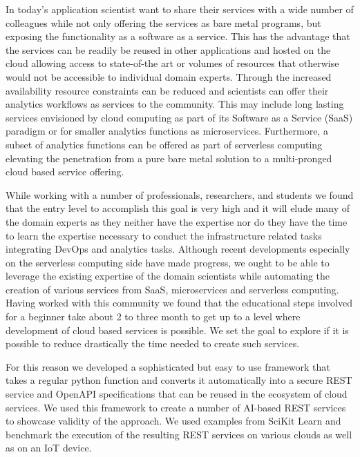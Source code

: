 In today's application scientist want to share their services with a wide number of colleagues while not only offering the services as bare metal programs, but exposing the functionality as a software as a service. This has the advantage that the services can be readily be reused in other applications and hosted on the cloud allowing access to state-of-the art or volumes of resources that otherwise would not be accessible to individual domain experts. Through the increased availability resource constraints can be reduced and scientists can offer their analytics workflows as services to the community. This may include long lasting services envisioned by cloud computing as part of its Software as a Service (SaaS) paradigm or for smaller analytics functions as microservices. Furthermore, a subset of analytics functions can be offered as part of serverless computing elevating the penetration from a pure bare metal solution to a multi-pronged cloud based service offering.

While working with a number of professionals, researchers, and students we found that the entry level to accomplish this goal is very high and it will elude many of the domain experts as they neither have the expertise nor do they have the time to learn the expertise necessary to conduct the infrastructure related tasks integrating DevOps and analytics tasks. Although recent developments especially on the serverless computing side have made progress, we ought to be able to leverage the existing expertise of the domain scientists while automating the creation of various services from SaaS, microservices and serverless computing.
Having worked with this community we found that the educational steps involved for a beginner take about 2 to three month to get up to a level where development of cloud based services is possible. We set the goal to explore if it is possible to reduce drastically the time needed to create such services.

For this reason we developed a sophisticated but easy to use framework that takes a regular python function and converts it automatically into a secure REST service and OpenAPI specifications \cite{openapi} that can be reused in the ecosystem of cloud services. We used this framework to create a number of AI-based REST services to showcase validity of the approach. We used examples from SciKit Learn \cite{scikit-learn} and benchmark the execution of the resulting REST services on various clouds as well as on an IoT device. 


